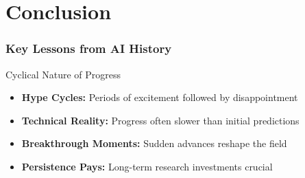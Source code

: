 \documentclass{beamer}
\begin{document}
\section{Conclusion}

\begin{frame}
    \frametitle{Key Lessons from AI History}
    \begin{alertblock}{Cyclical Nature of Progress}
        \begin{itemize}
            \item \textbf{Hype Cycles:} Periods of excitement followed by disappointment
            \item \textbf{Technical Reality:} Progress often slower than initial predictions
            \item \textbf{Breakthrough Moments:} Sudden advances reshape the field
            \item \textbf{Persistence Pays:} Long-term research investments crucial
        \end{itemize}
    \end{alertblock}

\end{frame}
\end{document}
